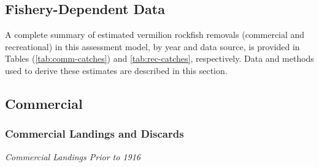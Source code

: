 \documentclass[11pt,
  english,
  a4paper,
]{article}
\begin{document}

\hypertarget{fishery-dependent-data}{%
\subsection{Fishery-Dependent Data}\label{fishery-dependent-data}}

\leavevmode\tagmcend\tagstructend

A complete summary of estimated vermilion rockfish removals (commercial and recreational) in this assessment model, by year and data source, is provided in Tables (\ref{tab:comm-catches}) and \ref{tab:rec-catches}, respectively. Data and methods used to derive these estimates are described in this section.


\hypertarget{commercial}{%
\subsection{Commercial}\label{commercial}}

\leavevmode\tagmcend\tagstructend


\hypertarget{commercial-landings-and-discards}{%
\subsubsection{Commercial Landings and Discards}\label{commercial-landings-and-discards}}

\leavevmode\tagmcend\tagstructend

\emph{Commercial Landings Prior to 1916}
\end{document}
